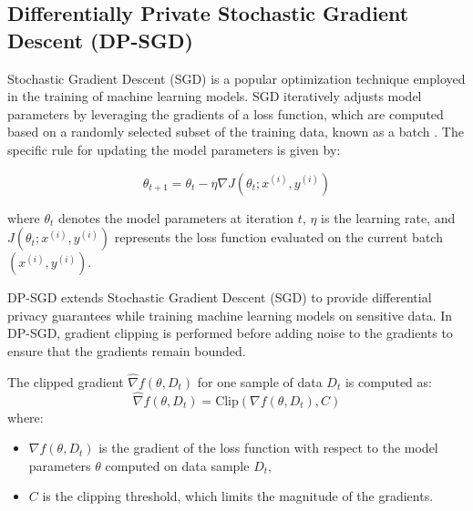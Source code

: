 \documentclass[11pt]{article}
\begin{document}
\subsection{Differentially Private Stochastic Gradient Descent (DP-SGD)}
\label{dpsgdsec}
Stochastic Gradient Descent (SGD) is a popular optimization technique employed in the training of machine learning models. SGD iteratively adjusts model parameters by leveraging the gradients of a loss function, which are computed based on a randomly selected subset of the training data, known as a batch \cite{gower2019sgd,tian2023recent}. The specific rule for updating the model parameters is given by:

\[
\theta_{t+1} = \theta_t - \eta \nabla J(\theta_t; x^{(i)}, y^{(i)})
\]

where \(\theta_t\) denotes the model parameters at iteration \(t\), \(\eta\) is the learning rate, and \(J(\theta_t; x^{(i)}, y^{(i)})\) represents the loss function evaluated on the current batch \((x^{(i)}, y^{(i)})\).

DP-SGD extends Stochastic Gradient Descent (SGD) to provide differential privacy guarantees while training machine learning models on sensitive data. In DP-SGD, gradient clipping is performed before adding noise to the gradients to ensure that the gradients remain bounded.

The clipped gradient \( \hat{\nabla} f(\theta, D_t) \) for one sample of data \( D_t \) is computed as:
\[ \hat{\nabla} f(\theta, D_t) = \text{Clip}(\nabla f(\theta, D_t), C) \]
where:
\begin{itemize}
\item \( \nabla f(\theta, D_t) \) is the gradient of the loss function with respect to the model parameters \( \theta \) computed on data sample \( D_t \),
\item \( C \) is the clipping threshold, which limits the magnitude of the gradients.
\end{itemize}
\end{document}

